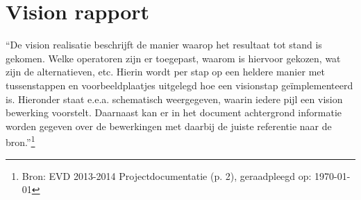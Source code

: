 \section{Vision rapport}

“De vision realisatie beschrijft de manier waarop het resultaat tot stand is
gekomen. Welke operatoren zijn er toegepast, waarom is hiervoor gekozen, wat
zijn de alternatieven, etc. Hierin wordt per stap op een heldere manier met
tussenstappen en voorbeeldplaatjes uitgelegd hoe een visionstap geïmplementeerd
is. Hieronder staat e.e.a. schematisch weergegeven, waarin iedere pijl een
vision bewerking voorstelt. Daarnaast kan er in het document achtergrond
informatie worden gegeven over de bewerkingen met daarbij de juiste referentie
naar de bron.”\footnote{Bron: EVD 2013-2014 Projectdocumentatie (p. 2),
geraadpleegd op: \today}

